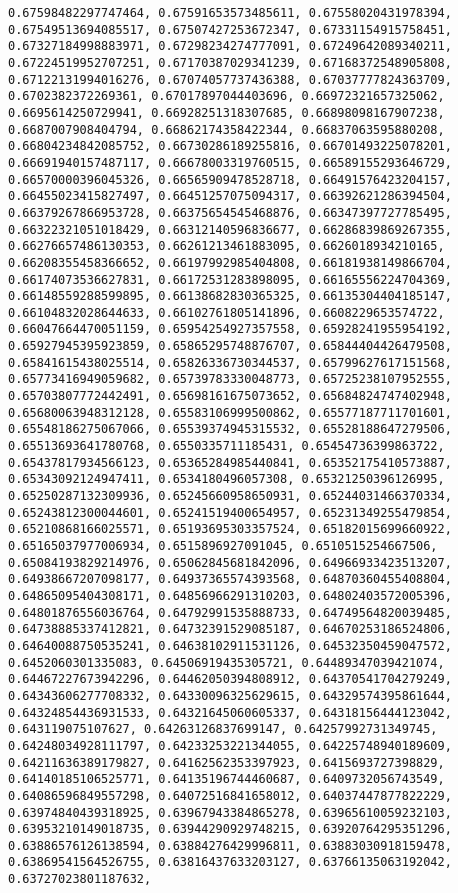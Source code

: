 \documentclass[11pt]{article}
\begin{document}
\begin{Verbatim}[commandchars=\\\{\}]
0.67598482297747464, 0.67591653573485611, 0.67558020431978394, 0.67549513694085517, 0.67507427253672347, 0.67331154915758451, 0.67327184998883971, 0.67298234274777091, 0.67249642089340211, 0.67224519952707251, 0.67170387029341239, 0.67168372548905808, 0.67122131994016276, 0.67074057737436388, 0.67037777824363709, 0.6702382372269361, 0.67017897044403696, 0.66972321657325062, 0.6695614250729941, 0.66928251318307685, 0.66898098167907238, 0.6687007908404794, 0.66862174358422344, 0.66837063595880208, 0.66804234842085752, 0.66730286189255816, 0.66701493225078201, 0.66691940157487117, 0.66678003319760515, 0.66589155293646729, 0.66570000396045326, 0.66565909478528718, 0.66491576423204157, 0.66455023415827497, 0.66451257075094317, 0.66392621286394504, 0.66379267866953728, 0.66375654545468876, 0.66347397727785495, 0.66322321051018429, 0.66312140596836677, 0.66286839869267355, 0.66276657486130353, 0.66261213461883095, 0.6626018934210165, 0.66208355458366652, 0.66197992985404808, 0.66181938149866704, 0.66174073536627831, 0.66172531283898095, 0.66165556224704369, 0.66148559288599895, 0.66138682830365325, 0.66135304404185147, 0.66104832028644633, 0.66102761805141896, 0.6608229653574722, 0.66047664470051159, 0.65954254927357558, 0.65928241955954192, 0.65927945395923859, 0.65865295748876707, 0.65844404426479508, 0.65841615438025514, 0.65826336730344537, 0.65799627617151568, 0.65773416949059682, 0.65739783330048773, 0.65725238107952555, 0.65703807772442491, 0.65698161675073652, 0.65684824747402948, 0.65680063948312128, 0.65583106999500862, 0.65577187711701601, 0.65548186275067066, 0.65539374945315532, 0.65528188647279506, 0.65513693641780768, 0.6550335711185431, 0.65454736399863722, 0.65437817934566123, 0.65365284985440841, 0.65352175410573887, 0.65343092124947411, 0.6534180496057308, 0.65321250396126995, 0.65250287132309936, 0.65245660958650931, 0.65244031466370334, 0.65243812300044601, 0.65241519400654957, 0.65231349255479854, 0.65210868166025571, 0.65193695303357524, 0.65182015699660922, 0.65165037977006934, 0.6515896927091045, 0.6510515254667506, 0.65084193829214976, 0.65062845681842096, 0.64966933423513207, 0.64938667207098177, 0.64937365574393568, 0.64870360455408804, 0.64865095404308171, 0.64856966291310203, 0.64802403572005396, 0.64801876556036764, 0.64792991535888733, 0.64749564820039485, 0.64738885337412821, 0.64732391529085187, 0.64670253186524806, 0.64640088750535241, 0.64638102911531126, 0.64532350459047572, 0.6452060301335083, 0.64506919435305721, 0.64489347039421074, 0.64467227673942296, 0.64462050394808912, 0.64370541704279249, 0.64343606277708332, 0.64330096325629615, 0.64329574395861644, 0.64324854436931533, 0.64321645060605337, 0.64318156444123042, 0.643119075107627, 0.64263126837699147, 0.64257992731349745, 0.64248034928111797, 0.64233253221344055, 0.64225748940189609, 0.64211636389179827, 0.64162562353397923, 0.6415693727398829, 0.64140185106525771, 0.64135196744460687, 0.6409732056743549, 0.64086596849557298, 0.64072516841658012, 0.64037447877822229, 0.63974840439318925, 0.63967943384865278, 0.63965610059232103, 0.63953210149018735, 0.63944290929748215, 0.63920764295351296, 0.63886576126138594, 0.63884276429996811, 0.63883030918159478, 0.63869541564526755, 0.63816437633203127, 0.63766135063192042, 0.63727023801187632, 
\end{Verbatim}
\end{document}
